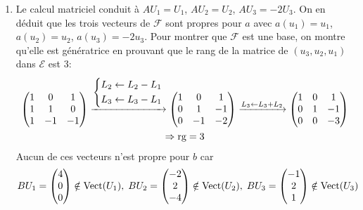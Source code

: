 \begin{enumerate}
\item Le calcul matriciel conduit à $AU_1= U_1$, $AU_2=U_2$, $AU_3=-2U_3$. On en déduit que les trois vecteurs de $\mathcal{F}$ sont propres pour $a$ avec $a(u_1)= u_1$, $a(u_2) = u_2$, $a(u_3) = -2u_3$. Pour montrer que $\mathcal{F}$ est une base, on montre qu'elle est génératrice en prouvant que le rang de la matrice de $(u_3,u_2,u_1)$ dans $\mathcal{E}$ est 3:
\begin{multline*}
\begin{pmatrix}
1 & 0 & 1 \\ 1 & 1 & 0 \\ 1 & -1 & -1 
\end{pmatrix}
\xrightarrow{
  \left\lbrace 
    \begin{aligned}
      &L_2 \leftarrow L_2 - L_1 \\  &L_3 \leftarrow L_3 - L_1 
    \end{aligned}
  \right. 
}
\begin{pmatrix}
1 & 0 & 1 \\ 0 & 1 & -1 \\ 0 & -1 & -2 
\end{pmatrix}
\xrightarrow{L_3\leftarrow L_3+L_2}
\begin{pmatrix}
1 & 0 & 1 \\ 0 & 1 & -1 \\ 0 & 0 & -3 
\end{pmatrix}\\
\Rightarrow \operatorname{rg} = 3
\end{multline*}
 Aucun de ces vecteurs n'est propre pour $b$ car
\begin{displaymath}
BU_1=
\begin{pmatrix}
4 \\ 0 \\ 0 
\end{pmatrix}\notin \operatorname{Vect}(U_1),\;
BU_2=
\begin{pmatrix}
-2 \\ 2 \\ -4 
\end{pmatrix}\notin \operatorname{Vect}(U_2),\;
BU_3=
\begin{pmatrix}
-1 \\ 2 \\ 1 
\end{pmatrix}\notin \operatorname{Vect}(U_3) 
\end{displaymath}


\end{enumerate}
